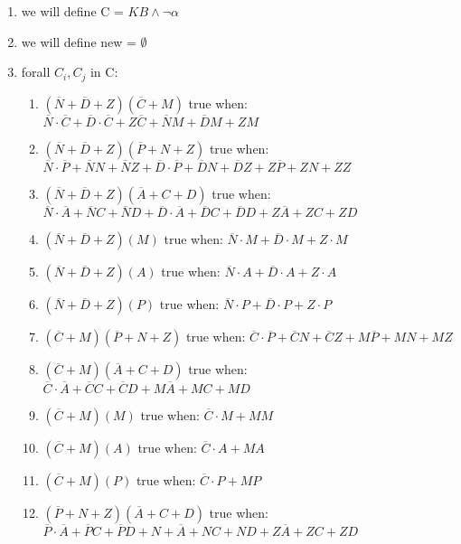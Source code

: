 \documentclass{article}
\begin{document}
\begin{enumerate}
    \item we will define C = $KB \land \neg \alpha$
    \item we will define new = $\emptyset$
    \item forall $C_i, C_j$ in C:
    \begin{enumerate}
        \item $(\overline N + \overline D + Z)(\overline C + M)$ true when: $\overline N \cdot \overline C + \overline D\cdot \overline C + Z \overline C + \overline NM + \overline D M + ZM$
        \item $(\overline N + \overline D + Z)(\overline P + N + Z)$ true when: $\overline N \cdot \overline P +\overline N N + \overline N Z + \overline D \cdot \overline P + \overline D N + \overline D Z + Z \overline P + ZN + ZZ$
        \item $(\overline N + \overline D + Z)(\overline A + C + D)$ true when: $\overline N \cdot \overline A +\overline N C + \overline N D + \overline D  \cdot \overline A + \overline D C + \overline D D + Z \overline A + ZC + ZD$
        \item $(\overline N + \overline D + Z)( M)$ true when: $\overline{N}\cdot  {M} +\overline D \cdot   M + Z \cdot  M$
        \item $(\overline N + \overline D + Z)(A)$ true when: $\overline{N}\cdot  {A} +\overline D \cdot   A + Z \cdot  A$
        \item $(\overline N + \overline D + Z)(P)$ true when: $\overline{N}\cdot  {P} +\overline D \cdot   P + Z \cdot  P$
        \item $(\overline C + M)(\overline P + N + Z)$ true when: $\overline C \cdot \overline P + \overline C N + \overline C Z + M \overline P + M N +MZ$
        \item $(\overline C + M)(\overline A + C+D)$ true when: $\overline C \cdot \overline A + \overline C C + \overline C D + M \overline A + MC+MD$
        \item $(\overline C + M)(M)$ true when: $\overline C \cdot  M + MM$
        \item $(\overline C + M)(A)$ true when: $\overline C \cdot  A + MA$
        \item $(\overline C + M)(P)$ true when: $\overline C \cdot  P + MP$
        \item $(\overline P + N + Z)(\overline A + C + D)$ true when: $\overline P \cdot \overline A + \overline P C + \overline P D + N + \overline A + NC +ND + Z\overline A + Z C + Z D$

\end{enumerate}
\end{enumerate}
\end{document}
